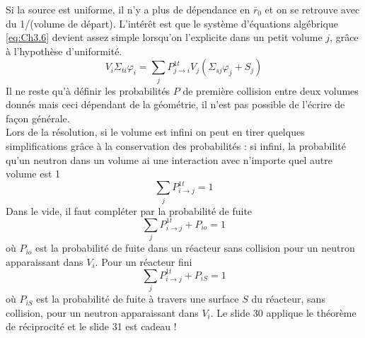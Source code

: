 Si la source est uniforme, il n'y a plus de dépendance en $\bar r_0$ et on se retrouve avec du 
1/(volume de départ). L'intérêt est que le système d'équations algébrique \eqref{eq:Ch3.6} devient 
assez simple lorsqu'on l'explicite dans un petit volume $j$, grâce à l'hypothèse d'uniformité.
\begin{equation}
{V_i}{\Sigma _{ti}}{\varphi _i} = \sum\limits_j    P_{j \to i}^{1t}{V_j}({\Sigma _{sj}}{\varphi _j} + {S_j})
\end{equation}
Il ne reste qu'à définir les probabilités $P$ de première collision entre deux volumes donnés mais 
ceci dépendant de la géométrie, il n'est pas possible de l'écrire de façon générale.\\

Lors de la résolution, si le volume est infini on peut en tirer quelques simplifications grâce à la
conservation des probabilités : si infini, la probabilité qu'un neutron dans un volume ai une 
interaction avec n'importe quel autre volume est 1
\begin{equation}
\sum\limits_j    P_{i \to j}^{1t} = 1
\end{equation}
Dans le vide, il faut compléter par la probabilité de fuite
\begin{equation}
\sum\limits_j    P_{i \to j}^{1t} + {P_{io}} = 1
\end{equation}
où $P_{io}$ est la probabilité de fuite dans un réacteur sans collision pour un neutron apparaissant 
dans $V_i$. Pour un réacteur fini
\begin{equation}
\sum\limits_j   P_{i \to j}^{1t} + {P_{iS}} = 1
\end{equation}
où $P_{iS}$ est la probabilité de fuite à travers une surface $S$ du réacteur, sans collision, pour 
un neutron apparaissant dans $V_i$. Le slide 30 applique le théorème de réciprocité et le slide 31 est cadeau ! 
